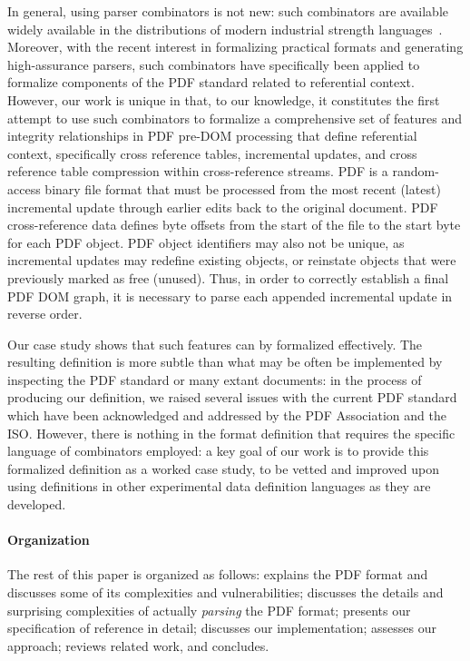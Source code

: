 In general, using parser combinators is not new: such combinators are
available widely available in the distributions of modern industrial
strength languages~\cite{leijen2001parsec,couprie2015nom,mundkurResearchReportParsley2020,bratus2017curing,willis2020staged}.
%
Moreover, with the recent interest in formalizing practical formats
and generating high-assurance parsers, such combinators have
specifically been applied to formalize components of the
PDF standard related to referential context.
%
However, our work is unique in that, to our knowledge, it constitutes
the first attempt to use such combinators to formalize a comprehensive
set of features and integrity relationships in PDF pre-DOM processing
that define referential context, specifically cross reference tables,
incremental updates, and cross reference table compression within
cross-reference streams. PDF is a random-access binary file format
that must be processed from the most recent (latest) incremental
update through earlier edits back to the original document.
%
PDF cross-reference data defines byte offsets from the start of the
file to the start byte for each PDF object. PDF object identifiers may
also not be unique, as incremental updates may redefine existing
objects, or reinstate objects that were previously marked as free
(unused).
%
Thus, in order to correctly establish a final PDF DOM graph, it is
necessary to parse each appended incremental update in reverse
order.

Our case study shows that such features can by formalized effectively.
%
The resulting definition is more subtle than what may be often be
implemented by inspecting the PDF standard or many extant documents:
in the process of producing our definition, we raised several issues
with the current PDF standard which have been acknowledged and
addressed by the PDF Association and the ISO.
%
However, there is nothing in the format definition that requires the
specific language of combinators employed: a key goal of our work is
to provide this formalized definition as a worked case study, to be
vetted and improved upon using definitions in other experimental data
definition languages as they are developed.

\paragraph*{Organization} The rest of this paper is organized as
follows:
%
 explains the PDF format and discusses some of its
complexities and vulnerabilities;
%
 discusses the details and surprising
complexities of actually \emph{parsing} the PDF format;
%
 presents our specification of reference in detail;
%
 discusses our implementation;
%
 assesses our approach;
%
 reviews related work, and %
 concludes.
